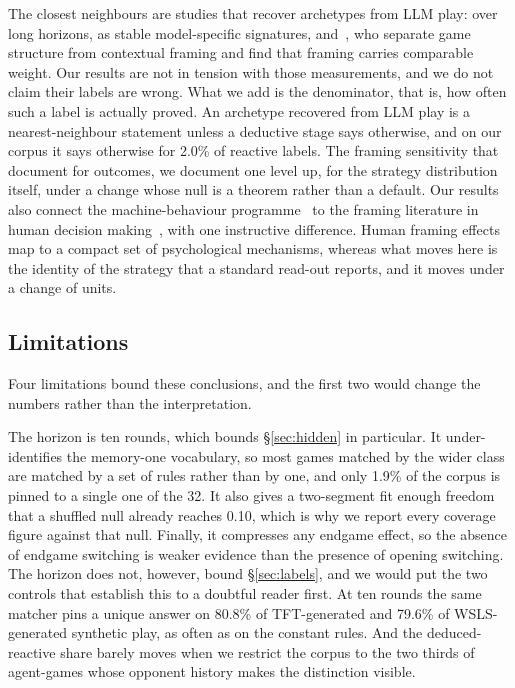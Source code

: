 \documentclass[11pt,a4paper]{article}
\begin{document}
The closest neighbours are studies that recover archetypes from LLM play:
\citet{fontana2024nicer} over long horizons, \citet{akata2023playing} as stable
model-specific signatures, and~\citet{lore2024strategic}, who separate game
structure from contextual framing and find that framing carries comparable
weight. Our results are not in tension with those measurements, and we do not
claim their labels are wrong. What we add is the denominator, that is, how
often such a label is actually proved. An archetype recovered from LLM play is a
nearest-neighbour statement unless a deductive stage says otherwise, and on our
corpus it says otherwise for 2.0\% of reactive labels. The framing sensitivity that~\citet{lore2024strategic} document for
outcomes, we document one level up, for the strategy distribution itself, under
a change whose null is a theorem rather than a default. Our results also connect
the machine-behaviour programme~\citep{rahwan2019machine} to the framing
literature in human decision
making~\citep{tversky1981framing,kahneman1979prospect}, with one instructive
difference. Human framing effects map to a compact set of psychological
mechanisms, whereas what moves here is the identity of the strategy that a
standard read-out reports, and it moves under a change of units.

\subsection{Limitations}

Four limitations bound these conclusions, and the first two would change the
numbers rather than the interpretation.

The horizon is ten rounds, which bounds \S\ref{sec:hidden} in particular. It
under-identifies the memory-one vocabulary, so most games matched by the wider
class are matched by a set of rules rather than by one, and only 1.9\% of the
corpus is pinned to a single one of the 32. It also gives a two-segment fit
enough freedom that a shuffled null already reaches 0.10, which is why we
report every coverage figure against that null. Finally, it compresses any
endgame effect, so the absence of endgame switching is weaker evidence than
the presence of opening switching. The horizon does not, however, bound
\S\ref{sec:labels}, and we would put the two controls that establish this to a
doubtful reader first. At ten rounds the same matcher pins a unique answer on
80.8\% of TFT-generated and 79.6\% of WSLS-generated synthetic play, as often
as on the constant rules. And the deduced-reactive share barely moves when we
restrict the corpus to the two thirds of agent-games whose opponent history
makes the distinction visible.
\end{document}
